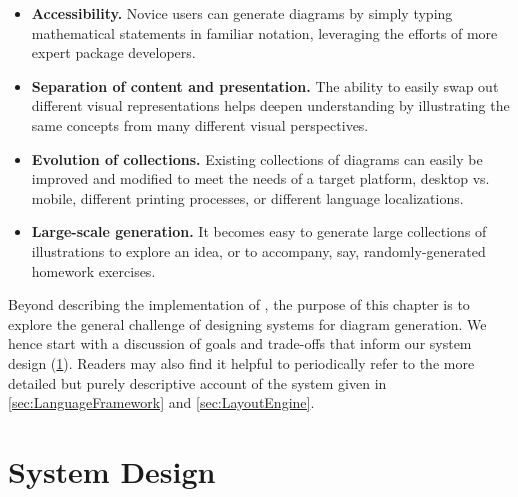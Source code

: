 \begin{itemize}
   \item \textbf{Accessibility.} Novice users can generate diagrams by simply typing mathematical statements in familiar notation, leveraging the efforts of more expert package developers.
   \item \textbf{Separation of content and presentation.} The ability to easily swap out different visual representations helps deepen understanding by illustrating the same concepts from many different visual perspectives.
   \item \textbf{Evolution of collections.} Existing collections of diagrams can easily be improved and modified to meet the needs of a target platform, \eg{} desktop vs. mobile, different printing processes, or different language localizations.
   \item \textbf{Large-scale generation.} It becomes easy to generate large collections of illustrations to explore an idea, or to accompany, say, randomly-generated homework exercises.
\end{itemize}

Beyond describing the implementation of \Penrose{}, the purpose of this chapter is to explore the general challenge of designing systems for diagram generation. We hence start with a discussion of goals and trade-offs that inform our system design (\cref{sec:SystemDesign}). Readers may also find it helpful to periodically refer to the more detailed but purely descriptive account of the system given in \cref{sec:LanguageFramework} and \cref{sec:LayoutEngine}.

\section{System Design}
\label{sec:SystemDesign}


